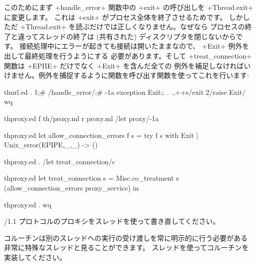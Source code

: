 このためにまず \ml+handle_error+ 関数中の \ml+exit+ の呼び出しを \ml+Thread.exit+ に変更します。
これは \ml+exit+ がプロセス全体を終了させるためです。
しかしただ \ml+Thread.exit+ を読ぶだけでは正しくなりません。なぜなら
プロセスの終了と違ってスレッドの終了は (共有された) ディスクリプタを閉じないからです。
接続処理中にエラーが起きても接続は開いたままなので、 \ml+Exit+ 例外を出して最終処理を行うようにする
必要があります。そして \ml+treat_connection+ 関数は \ml+EPIIE+ だけでなく \ml+Exit+ を含んだ全ての
例外を補足しなければいけません。例外を捕捉するように関数を呼び出す関数を使ってこれを行います:
%
\begin{codefile}{thurl.ed}
.
1;#
/handle_error/;#
-1a
exception Exit;;
.
.,++s/exit 2/raise Exit/
wq
\end{codefile}
%
\begin{codefile}{thproxy.ed}
f th/proxy.ml
r proxy.ml
/let proxy/-1a
\end{codefile}
\begin{listingcodefile}{thproxy.ed}
let allow_connection_errors f s =
  try f s with Exit | Unix_error(EPIPE,_,_) -> ()
\end{listingcodefile}
%
\begin{codefile}{thproxy.ed}
.
/let treat_connection/c
\end{codefile}
%
\begin{listingcodefile}{thproxy.ed}
let treat_connection s =
  Misc.co_treatment s (allow_connection_errors proxy_service) in
\end{listingcodefile}
%
\begin{codefile}{thproxy.ed}
.
wq
\end{codefile}

\begin{exercise}[noanswer]
\http/1.1 プロトコルのプロキシをスレッドを使って書き直してください。
\end{exercise}

\begin{exercise}[noanswer]
コルーチンは別のスレッドへの実行の受け渡しを常に明示的に行う必要がある
非常に特殊なスレッドと見ることができます。
スレッドを使ってコルーチンを実装してください。
\end{exercise}

